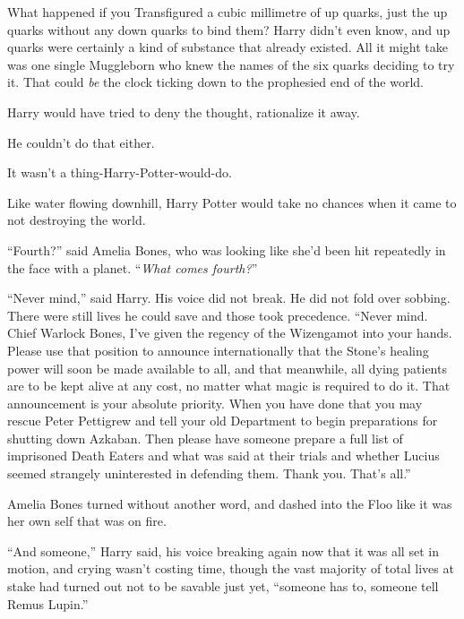What happened if you Transfigured a cubic millimetre of up quarks, just the up quarks without any down quarks to bind them? Harry didn’t even know, and up quarks were certainly a kind of substance that already existed. All it might take was one single Muggleborn who knew the names of the six quarks deciding to try it. That could \emph{be} the clock ticking down to the prophesied end of the world.

Harry would have tried to deny the thought, rationalize it away.

He couldn’t do that either.

It wasn’t a thing-Harry-Potter-would-do.

Like water flowing downhill, Harry Potter would take no chances when it came to not destroying the world.

“Fourth?” said Amelia Bones, who was looking like she’d been hit repeatedly in the face with a planet. “\emph{What comes fourth?}”

“Never mind,” said Harry. His voice did not break. He did not fold over sobbing. There were still lives he could save and those took precedence. “Never mind. Chief Warlock Bones, I’ve given the regency of the Wizengamot into your hands. Please use that position to announce internationally that the Stone’s healing power will soon be made available to all, and that meanwhile, all dying patients are to be kept alive at any cost, no matter what magic is required to do it. That announcement is your absolute priority. When you have done that you may rescue Peter Pettigrew and tell your old Department to begin preparations for shutting down Azkaban. Then please have someone prepare a full list of imprisoned Death Eaters and what was said at their trials and whether Lucius seemed strangely uninterested in defending them. Thank you. That’s all.”

Amelia Bones turned without another word, and dashed into the Floo like it was her own self that was on fire.

“And someone,” Harry said, his voice breaking again now that it was all set in motion, and crying wasn’t costing time, though the vast majority of total lives at stake had turned out not to be savable just yet, “someone has to, someone tell Remus Lupin.”

